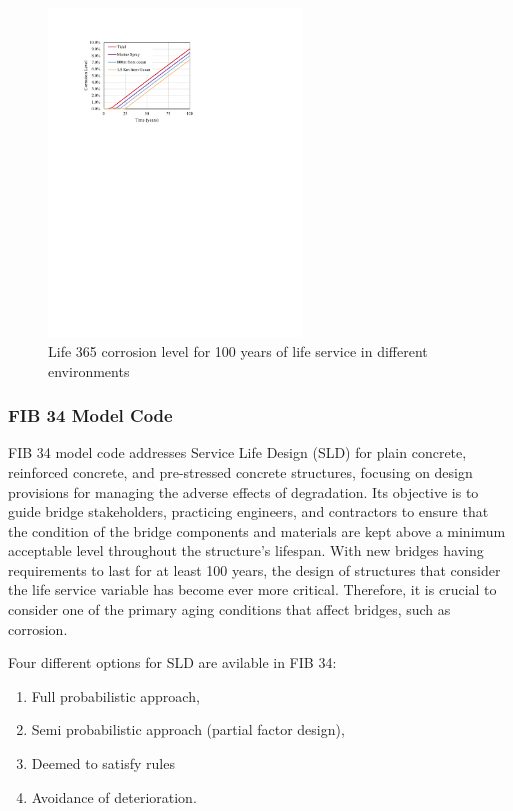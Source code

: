 \begin{figure}[htbp]
	\centering
	\includegraphics[width=0.6\textwidth]{VAC Thesis 2.0/Chapter-6/figs/Life365.pdf}
	\caption{Life 365 corrosion level for 100 years of life service in different environments}
	\label{fig:Life_365_example}
\end{figure}
\subsubsection{FIB 34 Model Code}
FIB 34 model code addresses Service Life Design (SLD) for plain concrete, reinforced concrete, and pre-stressed concrete structures, focusing on design provisions for managing the adverse effects of degradation. Its objective is to guide bridge stakeholders, practicing engineers, and contractors to ensure that the condition of the bridge components and materials are kept above a minimum acceptable level throughout the structure's lifespan. With new bridges having requirements to last for at least 100 years, the design of structures that consider the life service variable has become ever more critical. Therefore, it is crucial to consider one of the primary aging conditions that affect bridges, such as corrosion.

Four different options for SLD are avilable in FIB 34:
\begin{enumerate}
    \item Full probabilistic approach,
    \item Semi probabilistic approach (partial factor design),
    \item Deemed to satisfy rules
    \item Avoidance of deterioration.
\end{enumerate}

